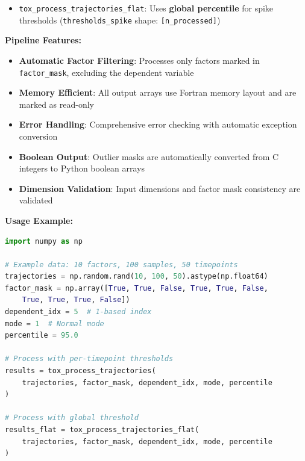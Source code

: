 \begin{enumerate}
\begin{itemize}
            \item \texttt{tox\_process\_trajectories\_flat}: Uses \textbf{global
                  percentile} for spike thresholds (\texttt{thresholds\_spike} shape: \texttt{[n\_processed]})
          \end{itemize}
          
          \textbf{Pipeline Features:}
          \begin{itemize}
            \item \textbf{Automatic Factor Filtering}: Processes only factors marked
                  in \texttt{factor\_mask}, excluding the dependent variable
                  
            \item \textbf{Memory Efficient}: All output arrays use Fortran memory layout
                  and are marked as read-only
                  
            \item \textbf{Error Handling}: Comprehensive error checking with automatic
                  exception conversion
                  
            \item \textbf{Boolean Output}: Outlier masks are automatically converted
                  from C integers to Python boolean arrays
                  
            \item \textbf{Dimension Validation}: Input dimensions and factor mask consistency
                  are validated
          \end{itemize}
          
          \textbf{Usage Example:} 
          \begin{lstlisting}[language=Python, caption={Typical Pipeline Usage}]
import numpy as np

# Example data: 10 factors, 100 samples, 50 timepoints
trajectories = np.random.rand(10, 100, 50).astype(np.float64)
factor_mask = np.array([True, True, False, True, True, False, 
    True, True, True, False])
dependent_idx = 5  # 1-based index
mode = 1  # Normal mode
percentile = 95.0

# Process with per-timepoint thresholds
results = tox_process_trajectories(
    trajectories, factor_mask, dependent_idx, mode, percentile
)

# Process with global threshold  
results_flat = tox_process_trajectories_flat(
    trajectories, factor_mask, dependent_idx, mode, percentile
)
    \end{lstlisting}
    

\end{enumerate}
